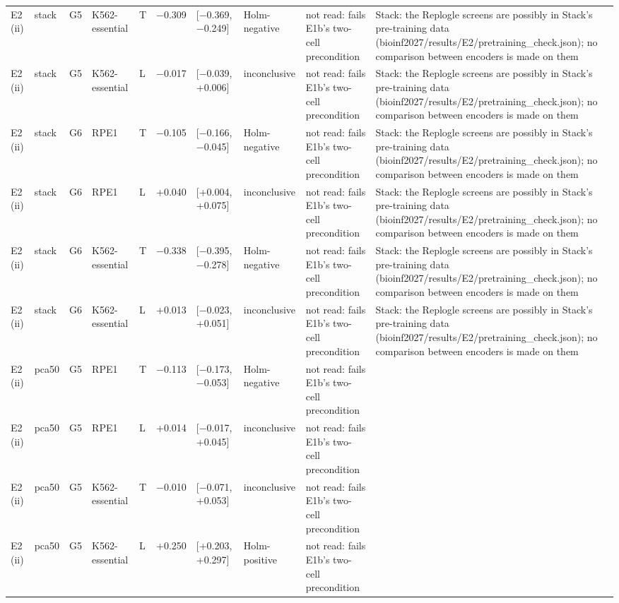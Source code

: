 \begin{tabular}{llllllllll}
E2 (ii) & stack & G5 & K562-essential & T & −0.309 & [−0.369, −0.249] & Holm-negative & not read: fails E1b's two-cell precondition & Stack: the Replogle screens are possibly in Stack's pre-training data (bioinf2027/results/E2/pretraining\_check.json); no comparison between encoders is made on them \\
E2 (ii) & stack & G5 & K562-essential & L & −0.017 & [−0.039, +0.006] & inconclusive & not read: fails E1b's two-cell precondition & Stack: the Replogle screens are possibly in Stack's pre-training data (bioinf2027/results/E2/pretraining\_check.json); no comparison between encoders is made on them \\
E2 (ii) & stack & G6 & RPE1 & T & −0.105 & [−0.166, −0.045] & Holm-negative & not read: fails E1b's two-cell precondition & Stack: the Replogle screens are possibly in Stack's pre-training data (bioinf2027/results/E2/pretraining\_check.json); no comparison between encoders is made on them \\
E2 (ii) & stack & G6 & RPE1 & L & +0.040 & [+0.004, +0.075] & inconclusive & not read: fails E1b's two-cell precondition & Stack: the Replogle screens are possibly in Stack's pre-training data (bioinf2027/results/E2/pretraining\_check.json); no comparison between encoders is made on them \\
E2 (ii) & stack & G6 & K562-essential & T & −0.338 & [−0.395, −0.278] & Holm-negative & not read: fails E1b's two-cell precondition & Stack: the Replogle screens are possibly in Stack's pre-training data (bioinf2027/results/E2/pretraining\_check.json); no comparison between encoders is made on them \\
E2 (ii) & stack & G6 & K562-essential & L & +0.013 & [−0.023, +0.051] & inconclusive & not read: fails E1b's two-cell precondition & Stack: the Replogle screens are possibly in Stack's pre-training data (bioinf2027/results/E2/pretraining\_check.json); no comparison between encoders is made on them \\
E2 (ii) & pca50 & G5 & RPE1 & T & −0.113 & [−0.173, −0.053] & Holm-negative & not read: fails E1b's two-cell precondition &  \\
E2 (ii) & pca50 & G5 & RPE1 & L & +0.014 & [−0.017, +0.045] & inconclusive & not read: fails E1b's two-cell precondition &  \\
E2 (ii) & pca50 & G5 & K562-essential & T & −0.010 & [−0.071, +0.053] & inconclusive & not read: fails E1b's two-cell precondition &  \\
E2 (ii) & pca50 & G5 & K562-essential & L & +0.250 & [+0.203, +0.297] & Holm-positive & not read: fails E1b's two-cell precondition &  \\

\end{tabular}
